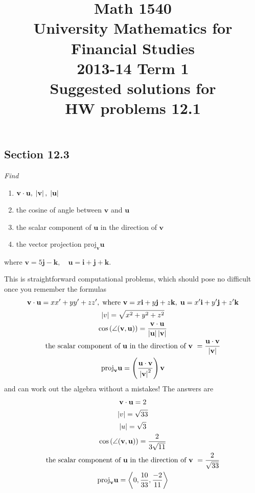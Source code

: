 \documentclass[8pt]{article} %
\title{Math 1540\\University Mathematics for Financial Studies\\2013-14 Term 1\\Suggested solutions for\\HW problems 12.1}
\begin{document}
\maketitle
	\renewcommand{\v}{\mathbf{v}}
	\renewcommand{\u}{\mathbf{u}}
	\renewcommand{\i}{\mathbf{i}}
	\renewcommand{\j}{\mathbf{j}}
	\renewcommand{\k}{\mathbf{k}}
	\newcommand{\myproj}{\mbox{proj}_{\v}{\u}}
\begin{description}
\section{Section 12.3}
\item[\# 5.]{
	{\it 
	Find
		\begin{enumerate}[label=\bfseries\alph*.]
			\item{$\mathbf{v}\cdot \mathbf{u},\;\myabs{\v},\;\myabs{\u}$}
			\item{the cosine of angle between $\v$ and $\u$}
			\item{the scalar component of $\u$ in the direction of $\v$}
			\item{the vector projection $\mbox{proj}_{\v}{\u}$}
		\end{enumerate}
		where $\v=5\j -\k,\quad \u=\i+\j+\k$.}
	This is straightforward computational problems, which should pose no difficult once you remember the formulas
	\begin{gather*}
		\v\cdot\u=xx'+yy'+zz',\;\mbox{where }\v=x\i+y\j+z\k,\;\u=x'\i+y'\j+z'\k\\
		\myabs{v}=\sqrt{x^2+y^2+z^2}\\
		\cos\left(\angle(\v,\u)\right)=\frac{\v\cdot\u}{\myabs{\u}\myabs{\v}}\\
		\mbox{the scalar component of $\u$ in the direction of $\v$ }=\frac{\u\cdot\v}{\myabs{\v}}\\
		\mbox{proj}_{\v}{\u}=\left(\frac{\u\cdot\v}{\myabs{\v}^2}\right)\v
	\end{gather*}
	and can work out the algebra without a mistakes! The answers are
	\begin{gather*}
		\v\cdot\u=2\\
		\myabs{v}=\sqrt{33}\\
		\myabs{u}=\sqrt{3}\\
		\cos\left(\angle(\v,\u)\right)=\frac{2}{3\sqrt{11}}\\
		\mbox{the scalar component of $\u$ in the direction of $\v$ }=\frac{2}{\sqrt{33}}\\
		\mbox{proj}_{\v}{\u}=\left<0,\frac{10}{33},\frac{-2}{11}\right>

\end{gather*}}
\end{description}
\end{document}
